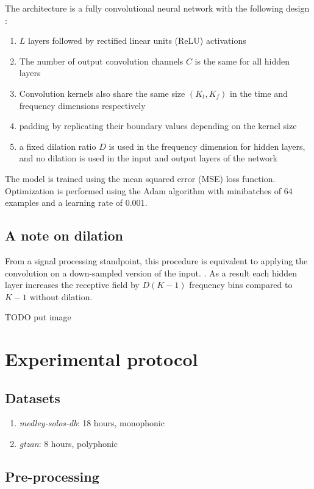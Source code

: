 \documentclass[a0,portrait,20pt]{a0poster}
\begin{document}
\begin{multicols}{2}
The architecture is a fully convolutional neural network with the following design :
\begin{enumerate}
  \item $L$ layers followed by rectified linear units (ReLU) activations
  \item The number of output convolution channels $C$ is the same for all hidden layers
   \item Convolution kernels also share the same size $(K_t, K_f)$ in the time and frequency dimensions respectively
   \item padding by replicating their boundary values depending on the kernel size
   \item a fixed dilation ratio $D$ is used in the frequency dimension for hidden layers, and no dilation is used in the input and output layers of the network
\end{enumerate}

The model is trained using the mean squared error (MSE) loss function. Optimization is performed using the Adam algorithm with minibatches of $64$ examples and a learning rate of $0.001$.


\subsection*{A note on dilation}

From a signal processing standpoint, this procedure is equivalent to applying the convolution on a down-sampled version of the input. . As a result each hidden layer increases the receptive field by $D(K-1)$ frequency bins compared to $K-1$ without dilation.

TODO put image


\section*{Experimental protocol}
\label{sec:protocol}

\subsection*{Datasets}

\begin{enumerate}
  \item \textit{medley-solos-db}: 18 hours, monophonic
  \item \textit{gtzan}: 8 hours, polyphonic
\end{enumerate}

\subsection*{Pre-processing}


\end{multicols}
\end{document}
